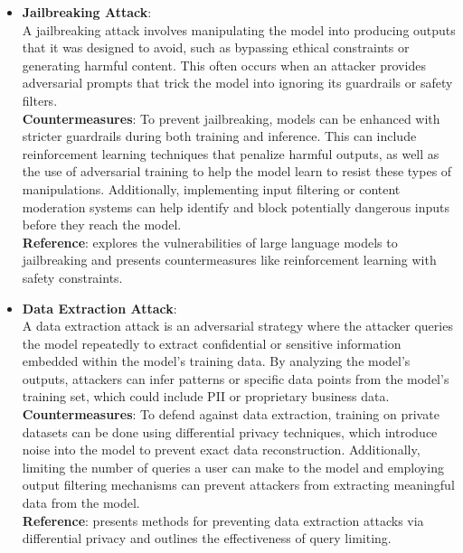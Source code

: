 \documentclass[12pt]{article}
\begin{document}
    \begin{itemize}
        \item \textbf{Jailbreaking Attack}: \\
        A jailbreaking attack involves manipulating the model into producing outputs that it was designed to avoid, such as bypassing ethical constraints or generating harmful content. This often occurs when an attacker provides adversarial prompts that trick the model into ignoring its guardrails or safety filters. \\
        \textbf{Countermeasures}: To prevent jailbreaking, models can be enhanced with stricter guardrails during both training and inference. This can include reinforcement learning techniques that penalize harmful outputs, as well as the use of adversarial training to help the model learn to resist these types of manipulations. Additionally, implementing input filtering or content moderation systems can help identify and block potentially dangerous inputs before they reach the model. \\
        \textbf{Reference}: \cite{Jailbreak_2021} explores the vulnerabilities of large language models to jailbreaking and presents countermeasures like reinforcement learning with safety constraints.

        \item \textbf{Data Extraction Attack}: \\
        A data extraction attack is an adversarial strategy where the attacker queries the model repeatedly to extract confidential or sensitive information embedded within the model’s training data. By analyzing the model's outputs, attackers can infer patterns or specific data points from the model’s training set, which could include PII or proprietary business data. \\
        \textbf{Countermeasures}: To defend against data extraction, training on private datasets can be done using differential privacy techniques, which introduce noise into the model to prevent exact data reconstruction. Additionally, limiting the number of queries a user can make to the model and employing output filtering mechanisms can prevent attackers from extracting meaningful data from the model. \\
        \textbf{Reference}: \cite{Shokri_2017} presents methods for preventing data extraction attacks via differential privacy and outlines the effectiveness of query limiting.


\end{itemize}
\end{document}
